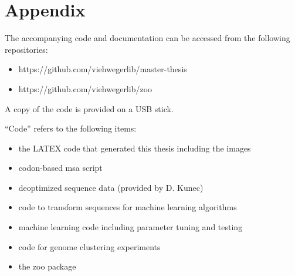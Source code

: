 \section{Appendix}

The accompanying code and documentation can be accessed from the following repositories:

\begin{itemize}
\item https://github.com/viehwegerlib/master-thesis
\item https://github.com/viehwegerlib/zoo
\end{itemize}

A copy of the code is provided on a USB stick.

``Code'' refers to the following items:

\begin{itemize}
    \item the LATEX code that generated this thesis including the images
    \item codon-based \gls{msa} script
    \item deoptimized sequence data (provided by D. Kunec)
    \item code to transform sequences for machine learning algorithms
    \item machine learning code including parameter tuning and testing
    \item code for genome clustering experiments
    \item the zoo package
\end{itemize}
